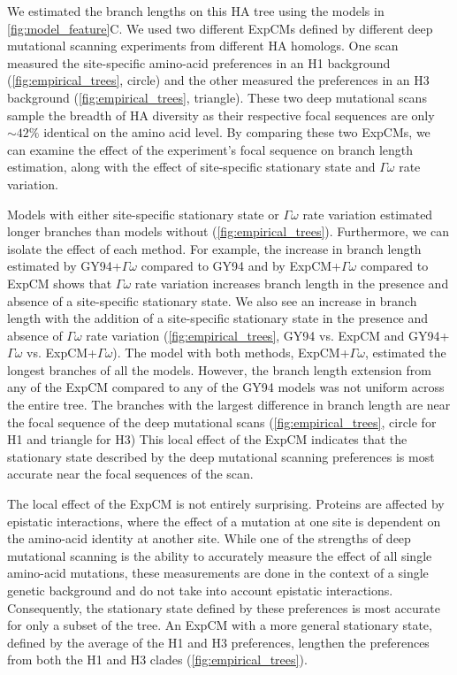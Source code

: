 \documentclass[11pt]{article}
\begin{document}
We estimated the branch lengths on this HA tree using the models in \ref{fig:model_feature}C. 
We used two different ExpCMs defined by different deep mutational scanning experiments from different HA homologs. 
One scan measured the site-specific amino-acid preferences in an H1 background (\ref{fig:empirical_trees}, circle) and the other measured the preferences in an H3 background (\ref{fig:empirical_trees}, triangle). 
These two deep mutational scans sample the breadth of HA diversity as their respective focal sequences are only $\sim42\%$ identical on the amino acid level. 
By comparing these two ExpCMs, we can examine the effect of the experiment's focal sequence on branch length estimation, along with the effect of site-specific stationary state and $\Gamma\omega$ rate variation.

Models with either site-specific stationary state or $\Gamma\omega$ rate variation estimated longer branches than models without (\ref{fig:empirical_trees}). 
Furthermore, we can isolate the effect of each method. 
For example, the increase in branch length estimated by GY94+$\Gamma\omega$ compared to GY94 and by ExpCM+$\Gamma\omega$ compared to ExpCM shows that $\Gamma\omega$ rate variation increases branch length in the presence and absence of a site-specific stationary state. 
We also see an increase in branch length with the addition of a site-specific stationary state in the presence and absence of $\Gamma\omega$ rate variation (\ref{fig:empirical_trees}, GY94 vs. ExpCM and GY94+$\Gamma\omega$ vs. ExpCM+$\Gamma\omega$). 
The model with both methods, ExpCM+$\Gamma\omega$, estimated the longest branches of all the models. 
However, the branch length extension from any of the ExpCM compared to any of the GY94 models was not uniform across the entire tree. 
The branches with the largest difference in branch length are near the focal sequence of the deep mutational scans (\ref{fig:empirical_trees}, circle for H1 and triangle for H3)
This local effect of the ExpCM indicates that the stationary state described by the deep mutational scanning preferences is most accurate near the focal sequences of the scan. 

The local effect of the ExpCM is not entirely surprising. 
Proteins are affected by epistatic interactions, where the effect of a mutation at one site is dependent on the amino-acid identity at another site. 
While one of the strengths of deep mutational scanning is the ability to accurately measure the effect of all single amino-acid mutations, these measurements are done in the context of a single genetic background and do not take into account epistatic interactions. 
Consequently, the stationary state defined by these preferences is most accurate for only a subset of the tree.
An ExpCM with a more general stationary state, defined by the average of the H1 and H3 preferences, lengthen the preferences from both the H1 and H3 clades (\ref{fig:empirical_trees}). 
\end{document}
